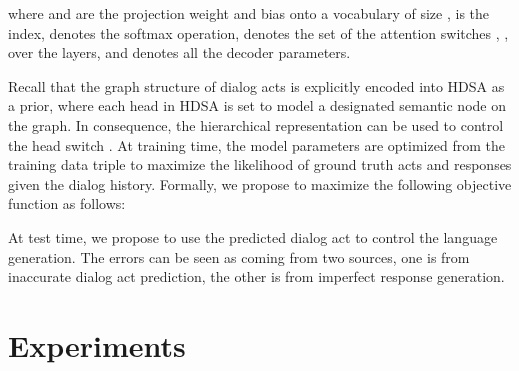 \documentclass[11pt,a4paper]{article}
\begin{document}
where  and  are the projection weight and bias onto a vocabulary of size ,  is the index,  denotes the softmax operation,  denotes the set of the attention switches , ,  over the  layers, and  denotes all the decoder parameters. 

Recall that the graph structure of dialog acts is explicitly encoded into HDSA as a prior, where each head in HDSA is set to model a designated semantic node on the graph. In consequence, the hierarchical representation  can be used to control the head switch . At training time, the model parameters  are optimized from the training data triple  to maximize the likelihood of ground truth acts and responses given the dialog history. Formally, we propose to maximize the following objective function as follows:

At test time, we propose to use the predicted dialog act  to control the language generation. The errors can be seen as coming from two sources, one is from inaccurate dialog act prediction, the other is from imperfect response generation. 

\section{Experiments}
\label{sec:dialog-act}
\end{document}
